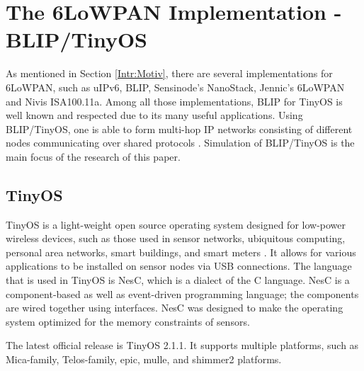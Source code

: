 \chapter{The 6LoWPAN Implementation - BLIP/TinyOS}
\label{Blip/TinyOS}
As mentioned in Section \ref{Intr:Motiv}, there are several implementations for 6LoWPAN, such as uIPv6, BLIP, Sensinode's NanoStack, Jennic's 6LoWPAN and Nivis ISA100.11a. Among all those implementations, BLIP for TinyOS is well known and respected due to its many useful applications. Using BLIP/TinyOS, one is able to form multi-hop IP networks consisting of different nodes communicating over shared protocols \cite{BLIP}. Simulation of BLIP/TinyOS is the main focus of the research of this paper.

\section{TinyOS}
\label{TinyOS}
TinyOS is a light-weight open source operating system designed for low-power wireless devices, such as those used in sensor networks, ubiquitous computing, personal area networks, smart buildings, and smart meters \cite{TinyOS}. It allows for various applications to be installed on sensor nodes via USB connections. The language that is used in TinyOS is NesC, which is a dialect of the C language. NesC is a component-based as well as event-driven programming language; the components are wired together using interfaces. NesC was designed to make the operating system optimized for the memory constraints of sensors.

The latest official release is TinyOS 2.1.1. It supports multiple platforms, such as Mica-family, Telos-family, epic, mulle, and shimmer2 platforms. 

